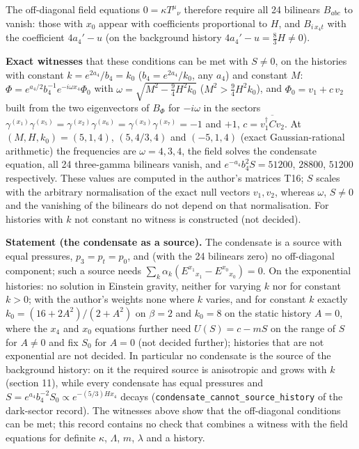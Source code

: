 \documentclass[11pt]{article}
\begin{document}
The off-diagonal field equations $0 = \kappa T^\mu{}_\nu$ therefore require all 24 bilinears $B_{abc}$ to vanish: those with $x_0$ appear with coefficients proportional to $H$, and $B_{i\,x_4 t}$ with the coefficient $4a_4' - u$ (on the background history $4a_4' - u = \tfrac83H \ne 0$).

\textbf{Exact witnesses} that these conditions can be met with $S \ne 0$, on the histories with constant $k = e^{2a_4}/b_4 = k_0$ ($b_4 = e^{2a_4}/k_0$, any $a_4$) and constant $M$: $\Phi = e^{a_4/2}b_4^{-1}e^{-i\omega x_4}\Phi_0$ with $\omega = \sqrt{M^2 - \tfrac94H^2k_0}$ ($M^2 > \tfrac94H^2k_0$), and $\Phi_0 = v_1 + c\,v_2$ built from the two eigenvectors of $B_\Phi$ for $-i\omega$ in the sectors $\gamma^{(x_1)}\gamma^{(x_5)} = \gamma^{(x_2)}\gamma^{(x_6)} = \gamma^{(x_3)}\gamma^{(x_7)} = -1$ and $+1$, $c = \overline{v_1^\dagger C v_2}$. At $(M, H, k_0) = (5, 1, 4)$, $(5, 4/3, 4)$ and $(-5, 1, 4)$ (exact Gaussian-rational arithmetic) the frequencies are $\omega = 4, 3, 4$, the field solves the condensate equation, all 24 three-gamma bilinears vanish, and $e^{-a_4}b_4^2S = 51200$, $28800$, $51200$ respectively. These values are computed in the author's matrices T16; $S$ scales with the arbitrary normalisation of the exact null vectors $v_1, v_2$, whereas $\omega$, $S \ne 0$ and the vanishing of the bilinears do not depend on that normalisation. For histories with $k$ not constant no witness is constructed (not decided).

\textbf{Statement (the condensate as a source).} The condensate is a source with equal pressures, $p_3 = p_t = p_0$, and (with the 24 bilinears zero) no off-diagonal component; such a source needs $\sum_k\alpha_k(E^{x_1}{}_{x_1} - E^{x_0}{}_{x_0}) = 0$. On the exponential histories: no solution in Einstein gravity, neither for varying $k$ nor for constant $k > 0$; with the author's weights none where $k$ varies, and for constant $k$ exactly $k_0 = (16 + 2A^2)/(2 + A^2)$ on $\beta = 2$ and $k_0 = 8$ on the static history $A = 0$, where the $x_4$ and $x_0$ equations further need $U(S) = c - mS$ on the range of $S$ for $A \ne 0$ and fix $S_0$ for $A = 0$ (not decided further); histories that are not exponential are not decided. In particular no condensate is the source of the background history: on it the required source is anisotropic and grows with $k$ (section 11), while every condensate has equal pressures and $S = e^{a_4}b_4^{-2}S_0 \propto e^{-(5/3)Hx_4}$ decays (\texttt{condensa\allowbreak{}te\_canno\allowbreak{}t\_source\allowbreak{}\_history} of the dark-sector record). The witnesses above show that the off-diagonal conditions can be met; this record contains no check that combines a witness with the field equations for definite $\kappa$, $\Lambda$, $m$, $\lambda$ and a history.
\end{document}
